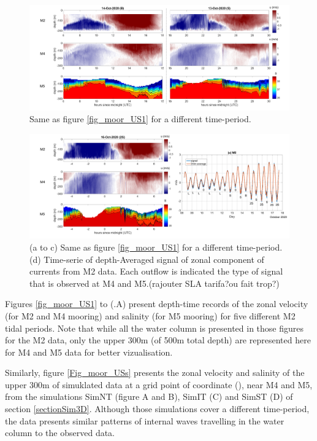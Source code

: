 \begin{figure}[!h]
 \includegraphics[width=\textwidth]{./GBR3D/US_moorings2.png}
 \caption {Same as figure \ref{fig_moor_US1} for a different time-period.}
 \label{fig_moor_US2}
\end{figure}

\begin{figure}[!h]
 \includegraphics[width=\textwidth]{./GBR3D/US_moorings3.png}
 \caption {(a to c) Same as figure \ref{fig_moor_US1} for a different time-period. (d) Time-serie of depth-Averaged signal of zonal component of currents from M2 data. Each outflow is indicated the type of signal that is observed at M4 and M5.(rajouter SLA tarifa?ou fait trop?)}
 \label{fig_moor_US3}
\end{figure}

Figures \ref{fig_moor_US1} to (.A) present depth-time records of the zonal velocity (for M2 and M4 mooring) and salinity (for M5 mooring) for five different M2 tidal periods. Note that while all the water column is presented in those figures for the M2 data, only the upper 300m (of 500m total depth) are represented here for M4 and M5 data for better vizualisation.

Similarly, figure \ref{Fig_moor_USs} presents the zonal velocity and salinity of the upper 300m of simuklated data at a grid point of coordinate (), near M4 and M5, from the simulations SimNT (figure A and B), SimIT (C) and SimST (D) of section \ref{sectionSim3D}. Although those simulations cover a different time-period, the data presents similar patterns of internal waves travelling in the water column to the observed data.


